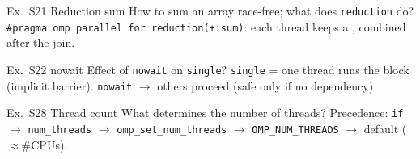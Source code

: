 \begin{example2}{Ex.\ S21 Reduction sum}
    How to sum an array race-free; what does \texttt{reduction} do?
    \tcblower
    \texttt{\#pragma omp parallel for reduction(+:sum)}: each thread keeps a , combined after the join.
\end{example2}

\begin{example2}{Ex.\ S22 nowait}
    Effect of \texttt{nowait} on \texttt{single}?
    \tcblower
    \texttt{single} = one thread runs the block (implicit barrier). \texttt{nowait}  $\to$ others proceed (safe only if no dependency).
\end{example2}

\begin{example2}{Ex.\ S28 Thread count}
    What determines the number of threads?
    \tcblower
    Precedence: \texttt{if} $\to$ \texttt{num\_threads} $\to$ \texttt{omp\_set\_num\_threads} $\to$ \texttt{OMP\_NUM\_THREADS} $\to$ default ($\approx$\#CPUs).
\end{example2}
